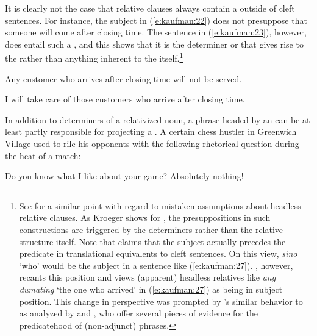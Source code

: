 \documentclass[output=paper]{langsci/langscibook}
\begin{document}
It is clearly not the case that relative clauses always contain a  outside of cleft sentences. For instance, the  subject in (\ref{e:kaufman:22}) does not presuppose that someone will come after closing time. The sentence in (\ref{e:kaufman:23}), however, does entail such a , and this shows that it is the determiner or  that gives rise to the  rather than anything inherent to the  itself.\footnote{See \citet{Kroeger:2009} for a similar point with regard to mistaken assumptions about headless relative clauses. As Kroeger shows for , the presuppositions in such constructions are triggered by the determiners rather than the relative structure itself. Note that \citet{Kroeger:1993} claims that the subject actually precedes the predicate in  translational equivalents to  cleft sentences. On this view, \textit{sino} `who' would be the subject in a sentence like (\ref{e:kaufman:27}). \citet[fn.3]{Kroeger:2009}, however, recants this position and views (apparent) headless relatives like \textit{ang dumating} `the one who arrived' in (\ref{e:kaufman:27}) as being in subject position. This change in perspective was prompted by 's similar behavior to  as analyzed by \citet{Paul:2008} and \citet{Potsdam:2009}, who offer several pieces of evidence for the predicatehood of (non-adjunct)  phrases.}

\begin{exe}
	\ex\label{e:kaufman:22}{Any customer who arrives after closing time will not be served.}
\end{exe}

\begin{exe}
	\ex\label{e:kaufman:23}{I will take care of those customers who arrive after closing time.}
\end{exe}

\noindent
In addition to determiners of a relativized noun, a phrase headed by an   can be at least partly responsible for projecting a . A certain chess hustler in Greenwich Village used to rile his opponents with the following rhetorical question during the heat of a match:

\begin{exe}
	\ex\label{e:kaufman:24}{Do you know what I like about your game? Absolutely nothing!}
\end{exe}
\end{document}
